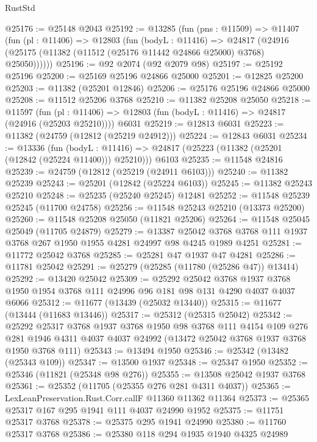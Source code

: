 \begin{lexlean}{RustStd}
\begin{coremodule}
@25176 := @25148 @2043
@25192 := @13285
    (fun (pns : @11509) =>
    @11407
      (fun (pl : @11406) =>
      @12803
        (fun (bodyL : @11416) =>
        @24817 (@24916 (@25175 (@11382 (@11512 (@25176 @11442 @24866 @25000) @3768) @25050))))))
@25196 := @92 @2074 (@92 @2079 @98)
@25197 := @25192 @25196
@25200 := @25169 @25196 @24866 @25000
@25201 := @12825 @25200
@25203 := @11382 (@25201 @12846)
@25206 := @25176 @25196 @24866 @25000
@25208 := @11512 @25206 @3768
@25210 := @11382 @25208 @25050
@25218 := @11597
    (fun (pl : @11406) => @12803 (fun (bodyL : @11416) => @24817 (@24916 (@25203 @25210))))
    @6031
@25219 := @12813 @6031
@25223 := @11382 (@24759 (@12812 (@25219 @24912)))
@25224 := @12843 @6031
@25234 := @13336
    (fun (bodyL : @11416) => @24817 (@25223 (@11382 (@25201 (@12842 (@25224 @11400))) @25210)))
    @6103
@25235 := @11548 @24816
@25239 := @24759 (@12812 (@25219 (@24911 @6103)))
@25240 := @11382 @25239
@25243 := @25201 (@12842 (@25224 @6103))
@25245 := @11382 @25243 @25210
@25248 := @25235 (@25240 @25245) @12481
@25252 := @11548 @25239 @25245 (@11700 @24758)
@25256 := @11548 @25243 @25210 (@13373 @25200)
@25260 := @11548 @25208 @25050 (@11821 @25206)
@25264 := @11548 @25045 @25049 (@11705 @24879)
@25279 := @13387
    @25042
    @3768
    @3768
    @111
    @1937
    @3768
    @267
    @1950
    @1955
    @4281
    @24997
    @98
    @4245
    @1989
    @4251
@25281 := @11772 @25042 @3768
@25285 := @25281 @47 @1937 @47 @4281
@25286 := @11781 @25042
@25291 := @25279 (@25285 (@11780 (@25286 @47)) @13414)
@25292 := @13420 @25042
@25309 := @25292
    @25042
    @3768
    @1937
    @3768
    @1950
    @1954
    @3768
    @111
    @24996
    @96
    @181
    @98
    @131
    @4290
    @4037
    @4037
    @6066
@25312 := @11677 (@13439 (@25032 @13440))
@25315 := @11677 (@13444 (@11683 @13446))
@25317 := @25312 (@25315 @25042)
@25342 := @25292
    @25317
    @3768
    @1937
    @3768
    @1950
    @98
    @3768
    @111
    @4154
    @109
    @276
    @281
    @1946
    @4311
    @4037
    @4037
    @24992
    (@13472 @25042 @3768 @1937 @3768 @1950 @3768 @111)
@25343 := @13494 @1950
@25346 := @25342 (@13482 (@25343 @109))
@25347 := @13500 @1937
@25348 := @25347 @1950
@25352 := @25346 (@11821 (@25348 @98 @276))
@25355 := @13508 @25042 @1937 @3768
@25361 := @25352 (@11705 (@25355 @276 @281 @4311 @4037))
@25365 := LexLeanPreservation.Rust.Corr.callF @11360 @11362 @11364
@25373 := @25365 @25317 @167 @295 @1941 @111 @4037 @24990 @1952
@25375 := @11751 @25317 @3768
@25378 := @25375 @295 @1941 @24990
@25380 := @11760 @25317 @3768
@25386 := @25380 @118 @294 @1935 @1940 @4325 @24989

\end{coremodule}
\end{lexlean}
